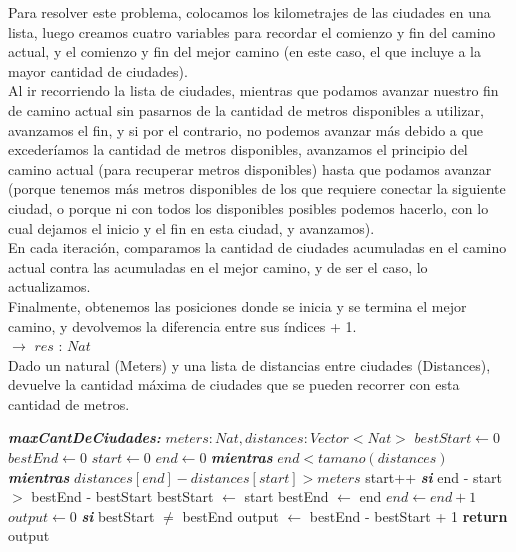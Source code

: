 \documentclass{article}
\theoremstyle{definition}
\theoremstyle{remark}
\begin{document}
Para resolver este problema, colocamos los kilometrajes de las ciudades en una lista, luego creamos cuatro variables para recordar el comienzo y fin del camino actual, y el comienzo y fin del mejor camino (en este caso, el que incluye a la mayor cantidad de ciudades). \\
Al ir recorriendo la lista de ciudades, mientras que podamos avanzar nuestro fin de camino actual sin pasarnos de la cantidad de metros disponibles a utilizar, avanzamos el fin, y si por el contrario, no podemos avanzar más debido a que excederíamos la cantidad de metros disponibles, avanzamos el principio del camino actual (para recuperar metros disponibles) hasta que podamos avanzar (porque tenemos más metros disponibles de los que requiere conectar la siguiente ciudad, o porque ni con todos los disponibles posibles podemos hacerlo, con lo cual dejamos el inicio y el fin en esta ciudad, y avanzamos). \\
En cada iteración, comparamos la cantidad de ciudades acumuladas en el camino actual contra las acumuladas en el mejor camino, y de ser el caso, lo actualizamos. \\
Finalmente, obtenemos las posiciones donde se inicia y se termina el mejor camino, y devolvemos la diferencia entre sus índices + 1. \\

 $\rightarrow$ $res$ :
$Nat$ \\ 
Dado un natural (Meters) y una lista de distancias entre ciudades (Distances), devuelve la cantidad máxima de ciudades que se pueden recorrer con esta cantidad de metros. \\ 

\begin{algorithmic}[1]
\State \textbf{\textit{maxCantDeCiudades:}} $meters: Nat, distances: Vector<Nat>$
\State $bestStart\gets 0$
\State $bestEnd\gets 0$
\State $start\gets 0$
\State $end\gets 0$
\State \textbf{\textit{mientras}} $end < tamano(distances)$
\State \qquad \textbf{\textit{mientras}} $distances[end] - distances[start] > meters$
\State \qquad \qquad start++
\State \qquad \textbf{\textit{si}} {end - start $>$ bestEnd - bestStart}
\State \qquad \qquad bestStart $\gets$ start
\State \qquad \qquad bestEnd $\gets$ end
\State $end\gets end + 1$
\State $output \gets 0$
\State \textbf{\textit{si}} bestStart $\neq$ bestEnd
\State \qquad output $\gets$ bestEnd - bestStart + 1
\State \textbf{return} output
\end{algorithmic}
\end{document}
